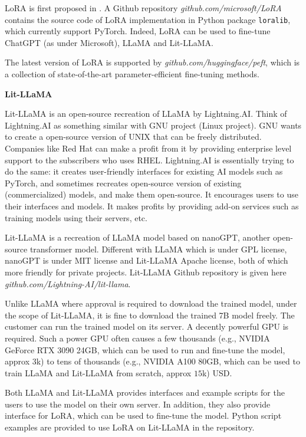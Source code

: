 LoRA is first proposed in \cite{hu2021lora}. A Github repository \textit{github.com/microsoft/LoRA} contains the source code of LoRA implementation in Python package \verb|loralib|, which currently support PyTorch. Indeed, LoRA can be used to fine-tune ChatGPT (as under Microsoft), LLaMA and Lit-LLaMA.

The latest version of LoRA is supported by \textit{github.com/huggingface/peft}, which is a collection of state-of-the-art parameter-efficient fine-tuning methods.

\vspace{0.1in}
\noindent \textbf{Lit-LLaMA}
\vspace{0.1in}

Lit-LLaMA is an open-source recreation of LLaMA by Lightning.AI. Think of Lightning.AI as something similar with GNU project (Linux project). GNU wants to create a open-source version of UNIX that can be freely distributed. Companies like Red Hat can make a profit from it by providing enterprise level support to the subscribers who uses RHEL. Lightning.AI is essentially trying to do the same: it creates user-friendly interfaces for existing AI models such as PyTorch, and sometimes recreates open-source version of existing (commercialized) models, and make them open-source. It encourages users to use their interfaces and models. It makes profits by providing add-on services such as training models using their servers, etc.

Lit-LLaMA is a recreation of LLaMA model based on nanoGPT, another open-source transformer model. Different with LLaMA which is under GPL license, nanoGPT is under MIT license and Lit-LLaMA Apache license, both of which more friendly for private projects. Lit-LLaMA Github repository is given here \textit{github.com/Lightning-AI/lit-llama}.

Unlike LLaMA where approval is required to download the trained model, under the scope of Lit-LLaMA, it is fine to download the trained 7B model freely. The customer can run the trained model on its server. A decently powerful GPU is required. Such a power GPU often causes a few thousands (e.g., NVIDIA GeForce RTX 3090 24GB, which can be used to run and fine-tune the model, approx $3$k) to tens of thousands (e.g., NVIDIA A100 80GB, which can be used to train LLaMA and Lit-LLaMA from scratch, approx $15$k) USD.

Both LLaMA and Lit-LLaMA provides interfaces and example scripts for the users to use the model on their own server. In addition, they also provide interface for LoRA, which can be used to fine-tune the model. Python script examples are provided to use LoRA on Lit-LLaMA in the repository.

